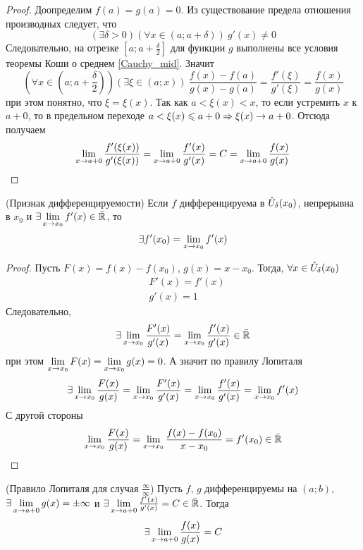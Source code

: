 \begin{proof}
	Доопределим $f(a) = g(a) = 0$. Из существование предела
	отношения производных следует, что
	\[
		(\exists \delta > 0)(\forall x
		\in (a; a + \delta))\ g'(x) \neq 0
	\]
	Следовательно, на отрезке
	$\left[a; a + \frac{\delta}{2}\right]$ для функции $g$
	выполнены все условия теоремы Коши о среднем \ref{Cauchy_mid}. Значит
	\[
		\left(\forall x \in \left(a; a + \frac{\delta}{2}\right)\right)
		\left(\exists \xi \in (a; x)\right)\ 
		\frac{f(x) - f(a)}{g(x) - g(a)} =
		\frac{f'(\xi)}{g'(\xi)} = \frac{f(x)}{g(x)}
	\]
	при этом понятно, что $\xi = \xi(x)$. Так как
	$a < \xi(x) < x$, то если устремить $x$ к $a + 0$,
	то в предельном переходе $a < \xi(x) \leqslant a + 0 \Rightarrow \xi(x) \to a + 0$.
	Отсюда получаем
	\[
		\lim\limits_{x \to a + 0} \frac{f'(\xi(x))}{g'(\xi(x))} = \lim\limits_{x \to a + 0} \frac{f'(x)}{g'(x)} = C = \lim\limits_{x \to a + 0} \frac{f(x)}{g(x)}
	\]
\end{proof}

\begin{corollary} (Признак дифференцируемости)
	Если $f$ дифференцируема в $\mathring{U}_\delta(x_0)$,
	непрерывна в $x_0$ и $\exists \lim\limits_{x \to x_0} f'(x)
	\in \bar{\mathbb{R}}$, то
	\[
	\exists f'(x_0) = \lim\limits_{x \to x_0} f'(x)
	\]
\end{corollary}

\begin{proof}
	Пусть $F(x) = f(x) - f(x_0)$, $g(x) = x - x_0$. Тогда,
	$\forall x \in \mathring{U}_\delta(x_0)$
	\begin{align*}
	&F'(x) = f'(x)
	\\
	&g'(x) = 1
	\end{align*}
	Следовательно,
	\[
	\exists \lim\limits_{x \to x_0} \frac{F'(x)}{g'(x)} =
	\lim\limits_{x \to x_0} \frac{f'(x)}{g'(x)} \in \bar{\mathbb{R}}
	\]
	при этом $\lim\limits_{x \to x_0} F(x) = \lim\limits_{x \to x_0}
	g(x) = 0$. А значит по правилу Лопиталя
	\[
	\exists \lim\limits_{x \to x_0} \frac{F(x)}{g(x)} =
	\lim\limits_{x \to x_0} \frac{F'(x)}{g'(x)} =
	\lim\limits_{x \to x_0} \frac{f'(x)}{g'(x)} =
	\lim\limits_{x \to x_0} f'(x)
	\]
	С другой стороны
	\[
	\lim\limits_{x \to x_0} \frac{F(x)}{g(x)} =
	\lim\limits_{x \to x_0} \frac{f(x) - f(x_0)}{x - x_0} =
	f'(x_0) \in \bar{\mathbb{R}}
	\]
\end{proof}

\begin{theorem} (Правило Лопиталя для случая
	$\frac{\infty}{\infty}$)
	Пусть $f$, $g$ дифференцируемы на $(a; b)$,
	$\exists \lim\limits_{x \to a + 0} g(x) = \pm \infty$ и
	$\exists \lim\limits_{x \to a + 0} \frac{f'(x)}{g'(x)} =
	C \in \bar{\mathbb{R}}$. Тогда
	\[
		\exists \lim\limits_{x \to a + 0} \frac{f(x)}{g(x)} = C
	\]
\end{theorem}

